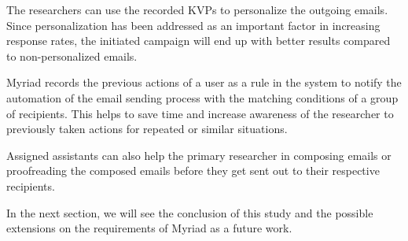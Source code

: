 The researchers can use the recorded \ac{KVP}s to personalize the outgoing emails. Since personalization has been addressed as an important factor in increasing response rates, the initiated campaign will end up with better results compared to non-personalized emails.
\vspace{1cm}

Myriad records the previous actions of a user as a rule in the system to notify the automation of the email sending process with the matching conditions of a group of recipients. This helps to save time and increase awareness of the researcher to previously taken actions for repeated or similar situations.
\vspace{1cm}

Assigned assistants can also help the primary researcher in composing emails or proofreading the composed emails before they get sent out to their respective recipients.

In the next section, we will see the conclusion of this study and the possible extensions on the requirements of Myriad as a future work.

\clearemptydoublepage

